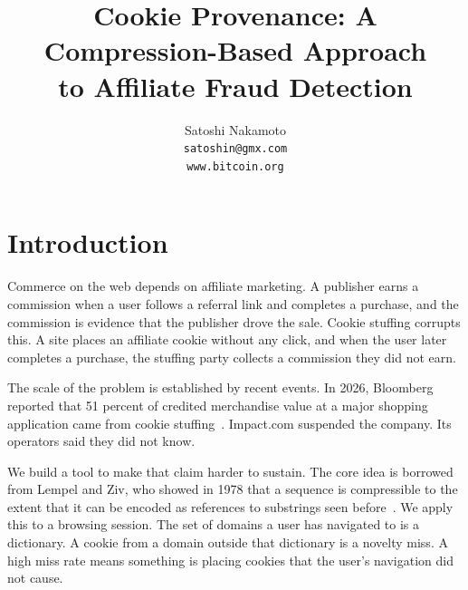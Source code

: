 \documentclass[10pt,twocolumn,letterpaper]{article}
\title{\Large\bf Cookie Provenance: A Compression-Based Approach\\to Affiliate Fraud Detection}
\author{
  Satoshi Nakamoto \\
  \texttt{satoshin@gmx.com} \\
  \texttt{www.bitcoin.org}
}
\date{}
\begin{document}

\section{Introduction}

Commerce on the web depends on affiliate marketing. A publisher earns a
commission when a user follows a referral link and completes a purchase, and
the commission is evidence that the publisher drove the sale. Cookie stuffing
corrupts this. A site places an affiliate cookie without any click, and when
the user later completes a purchase, the stuffing party collects a commission
they did not earn.

The scale of the problem is established by recent events. In 2026, Bloomberg
reported that 51 percent of credited merchandise value at a major shopping
application came from cookie stuffing~\cite{bloomberg2026}. Impact.com
suspended the company. Its operators said they did not know.

We build a tool to make that claim harder to sustain. The core idea is
borrowed from Lempel and Ziv, who showed in 1978 that a sequence is
compressible to the extent that it can be encoded as references to substrings
seen before~\cite{lz78}. We apply this to a browsing session. The set of
domains a user has navigated to is a dictionary. A cookie from a domain
outside that dictionary is a novelty miss. A high miss rate means something
is placing cookies that the user's navigation did not cause.
\end{document}
